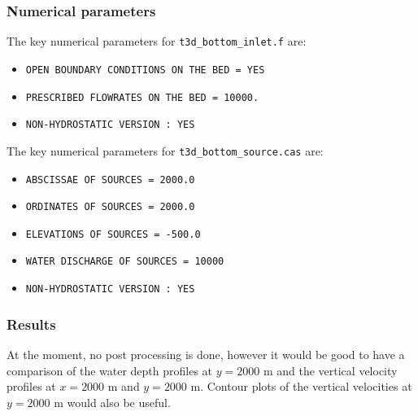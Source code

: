 %
%
\subsubsection{Numerical parameters}
%
The key numerical parameters for \texttt{t3d\_bottom\_inlet.f} are:

\begin{itemize}
\item \texttt{OPEN BOUNDARY CONDITIONS ON THE BED = YES}
\item \texttt{PRESCRIBED FLOWRATES ON THE BED = 10000.}
\item \texttt{NON-HYDROSTATIC VERSION : YES}
\end{itemize}

The key numerical parameters for \texttt{t3d\_bottom\_source.cas} are:

\begin{itemize}
\item \texttt{ABSCISSAE OF SOURCES = 2000.0}
\item \texttt{ORDINATES OF SOURCES = 2000.0}
\item \texttt{ELEVATIONS OF SOURCES = -500.0}
\item \texttt{WATER DISCHARGE OF SOURCES = 10000}
\item \texttt{NON-HYDROSTATIC VERSION : YES}
\end{itemize}

%
%
\subsubsection{Results}
%
At the moment, no post processing is done, however it would be good to have a comparison of the water depth profiles at $y=2000$ m and the vertical velocity profiles at $x=2000$ m and $y=2000$ m. Contour plots of the vertical velocities at $y=2000$ m would also be useful.



